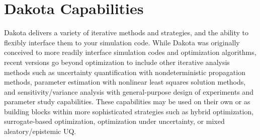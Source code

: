 \section{Dakota Capabilities}\label{intro:capabilities}

Dakota delivers a variety of iterative methods and strategies, and the
ability to flexibly interface them to your simulation code. While
Dakota was originally conceived to more readily interface simulation
codes and optimization algorithms, recent versions go beyond
optimization to include other iterative analysis methods such as
uncertainty quantification with nondeterministic propagation methods,
parameter estimation with nonlinear least squares solution methods,
and sensitivity/variance analysis with general-purpose design of
experiments and parameter study capabilities. These capabilities may
be used on their own or as building blocks within more sophisticated
strategies such as hybrid optimization, surrogate-based optimization,
optimization under uncertainty, or mixed aleatory/epistemic UQ. 

